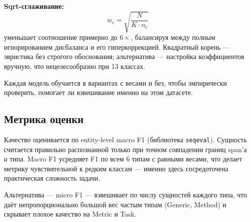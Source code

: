 \textbf{Sqrt-сглаживание:}
\[
    w_c = \sqrt{\frac{N}{K \cdot n_c}}
\]
уменьшает соотношение примерно до $6 \times$, балансируя между полным игнорированием дисбаланса и его гиперкоррекцией. Квадратный корень --- эвристика без строгого обоснования; альтернатива --- настройка коэффициентов вручную, что нецелесообразно при 13 классах.

Каждая модель обучается в вариантах с весами и без, чтобы эмпирически проверить, помогает ли взвешивание именно на этом датасете.

\subsection{Метрика оценки}

Качество оценивается по entity-level macro F1 (библиотека \texttt{seqeval}). Сущность считается правильно распознанной только при точном совпадении границ span'а \textit{и} типа. Macro F1 усредняет F1 по всем 6 типам с равными весами, что делает метрику чувствительной к редким классам --- именно здесь сосредоточена практическая сложность задачи.

Альтернатива --- micro F1 --- взвешивает по числу сущностей каждого типа, что даёт непропорционально большой вес частым типам (Generic, Method) и скрывает плохое качество на Metric и Task.
